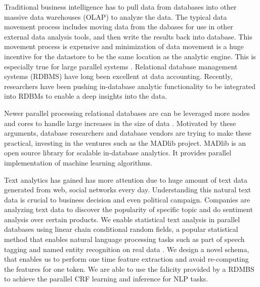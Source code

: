 \documentclass[11pt,letterpaper]{article}
\begin{document}
Traditional business intelligence has to pull data from databases into other massive 
data warehouses (OLAP) to analyze the data. 
The typical data movement process includes moving data from the dabases for use in other external 
data analysis tools, and then write the results back into database.
This movement process is expensive and minimization of data movement is a huge incentive for the datastore 
to be the same location as the analytic engine.
This is especially true for large parallel systems \cite{ananthanarayanan2011disk}.
Relational database management systems (RDBMS) have long been excellent at data accounting.
Recently, researchers have been pushing in-database analytic functionality to be integrated 
into RDBMs to enable a deep insights into the data.

Newer parallel processing relational databases are can be leveraged more nodes and cores to handle large
increases in the size of data \cite{DeWitt:1992:PDS:129888.129894}. 
Motivated by these arguments, database researchers and database vendors are trying to make these practical,
investing in the ventures such as the MADlib project. 
MADlib is an open source library for scalable in-database analytics.
It provides parallel implementation of machine learning algorithms.

Text analytics has gained has more attention due to huge amount of text data generated from web, 
social networks every day.
Understanding this natural text data is crucial to business decision and even political campaign. 
Companies are analyzing text data to discover the popularity of specific topic and do sentiment analysis over certain products.
We enable statistical text analysis in parallel databases using linear chain conditional random fields, a
popular statistical method that enables
natural language processing tasks such as part of speech tagging and named entity recognition on
real data \cite{DBLP:conf/icml/LaffertyMP01}.
We design a novel schema, that enables us to 
perform one time feature extraction and avoid re-computing the features for one token. 
We are able to use the falicity provided by a RDMBS to achieve the parallel CRF learning and inference for NLP tasks.
\end{document}
